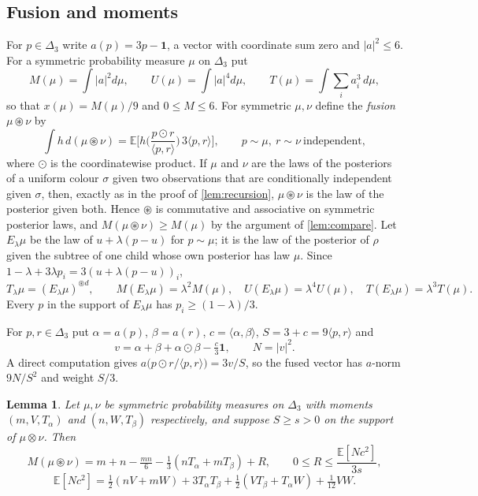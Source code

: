 \documentclass[11pt]{amsart}
\newtheorem{lemma}[theorem]{Lemma}
\theoremstyle{definition}
\theoremstyle{remark}
\newcommand{\E}{\mathbb{E}}
\newcommand{\one}{\mathbf{1}}
\newcommand{\Simp}{\Delta_3}
\begin{document}
\subsection{Fusion and moments}
For $p\in\Simp$ write $a(p)=3p-\one$, a vector with coordinate sum zero and $|a|^2\le6$. For a symmetric
probability measure $\mu$ on $\Simp$ put
\[
M(\mu)=\int|a|^2d\mu,\qquad U(\mu)=\int|a|^4d\mu,\qquad T(\mu)=\int\textstyle\sum_ia_i^3\,d\mu,
\]
so that $x(\mu)=M(\mu)/9$ and $0\le M\le6$. For symmetric $\mu,\nu$ define the \emph{fusion} $\mu\circledast\nu$ by
\[
\int h\,d(\mu\circledast\nu)=\E\Big[h\Big(\frac{p\odot r}{\langle p,r\rangle}\Big)\,3\langle p,r\rangle\Big],
\qquad p\sim\mu,\ r\sim\nu\ \text{independent},
\]
where $\odot$ is the coordinatewise product. If $\mu$ and $\nu$ are the laws of the posteriors of a uniform colour
$\sigma$ given two observations that are conditionally independent given $\sigma$, then, exactly as in the proof
of \cref{lem:recursion}, $\mu\circledast\nu$ is the law of the posterior given both. Hence $\circledast$ is
commutative and associative on symmetric posterior laws, and $M(\mu\circledast\nu)\ge M(\mu)$ by the argument of
\cref{lem:compare}. Let $E_\lambda\mu$ be the law of $u+\lambda(p-u)$ for $p\sim\mu$; it is the law of the
posterior of $\rho$ given the subtree of one child whose own posterior has law $\mu$. Since
$1-\lambda+3\lambda p_i=3(u+\lambda(p-u))_i$,
\[
T_\lambda\mu=(E_\lambda\mu)^{\circledast d},\qquad
M(E_\lambda\mu)=\lambda^2M(\mu),\quad U(E_\lambda\mu)=\lambda^4U(\mu),\quad T(E_\lambda\mu)=\lambda^3T(\mu).
\]
Every $p$ in the support of $E_\lambda\mu$ has $p_i\ge(1-\lambda)/3$.

For $p,r\in\Simp$ put $\alpha=a(p)$, $\beta=a(r)$, $c=\langle\alpha,\beta\rangle$, $S=3+c=9\langle p,r\rangle$ and
\[
v=\alpha+\beta+\alpha\odot\beta-\tfrac c3\one,\qquad N=|v|^2 .
\]
A direct computation gives $a\big(p\odot r/\langle p,r\rangle\big)=3v/S$, so the fused vector has $a$-norm
$9N/S^2$ and weight $S/3$.

\begin{lemma}\label{lem:variance}
Let $\mu,\nu$ be symmetric probability measures on $\Simp$ with moments $(m,V,T_\alpha)$ and $(n,W,T_\beta)$
respectively, and suppose $S\ge s>0$ on the support of $\mu\otimes\nu$. Then
\[
M(\mu\circledast\nu)=m+n-\tfrac{mn}6-\tfrac13(nT_\alpha+mT_\beta)+R,\qquad 0\le R\le\frac{\E[Nc^2]}{3s},
\]
\[
\E[Nc^2]=\tfrac12(nV+mW)+3T_\alpha T_\beta+\tfrac12(VT_\beta+T_\alpha W)+\tfrac1{12}VW .
\]
\end{lemma}
\end{document}
